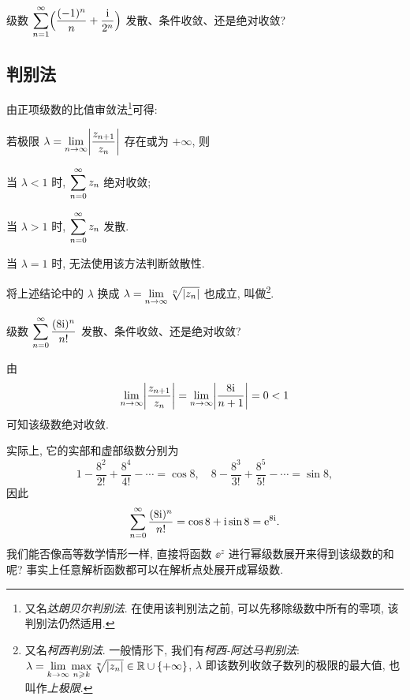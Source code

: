 \begin{exercise}
  级数 $\displaystyle\sum_{n=1}^{\infty} \Bigl(\frac{(-1)^n}n+\frac {\mathrm{i}}{2^n}\Bigr)$ 发散、条件收敛、还是绝对收敛?
\end{exercise}


\subsection{判别法}

由正项级数的比值审敛法\footnote{又名\emph{达朗贝尔判别法}. 在使用该判别法之前, 可以先移除级数中所有的零项, 该判别法仍然适用.}可得:
\begin{theorem}[比值审敛法]
  若极限 $\lambda=\lim\limits_{n\rightarrow\infty}\biggl\vert\dfrac{z_{n+1}}{z_n}\biggr\vert$ 存在或为 $+\infty$, 则
  \begin{enuma}
    \item 当 $\lambda<1$ 时, $\displaystyle\sum_{n=0}^{\infty} z_n$ 绝对收敛;
    \item 当 $\lambda>1$ 时, $\displaystyle\sum_{n=0}^{\infty} z_n$ 发散.
  \end{enuma}
\end{theorem}
当 $\lambda=1$ 时, 无法使用该方法判断敛散性.

将上述结论中的 $\lambda$ 换成 \alert{$\lambda=\lim\limits_{n\rightarrow\infty}\sqrt[n]{\lvert z_n\rvert}$} 也成立, 叫做\footnote{
  又名\emph{柯西判别法}.
  一般情形下, 我们有\emph{柯西-阿达马判别法}: 
  $\lambda=\lim\limits_{k\rightarrow\infty}\max\limits_{n\geqslant k}\sqrt[n]{\lvert z_n\rvert}\in{\mathbb{R}}\cup\{+\infty\}$, $\lambda$ 即该数列收敛子数列的极限的最大值, 也叫作\emph{上极限}.
}.

\begin{example}
  级数 $\displaystyle\sum_{n=0}^{\infty} \frac{(8\mathrm{i})^n}{n!}$ 发散、条件收敛、还是绝对收敛?
\end{example}

\begin{solution}
  由
  \[
     \lim_{n\rightarrow\infty}\biggl\vert\frac{z_{n+1}}{z_n}\biggr\vert
    =\lim_{n\rightarrow\infty}\biggl\vert\dfrac{8\mathrm{i}}{n+1}\biggr\vert
    =0<1
  \]
  可知该级数绝对收敛.
\end{solution}

实际上, 它的实部和虚部级数分别为
\[
  1-\frac{8^2}{2!}+\frac{8^4}{4!}-\cdots=\cos 8,\quad
  8-\frac{8^3}{3!}+\frac{8^5}{5!}-\cdots=\sin 8,
\]
因此
\[
   \displaystyle\sum_{n=0}^{\infty} \frac{(8\mathrm{i})^n}{n!}
  =\cos 8+\mathrm{i} \sin 8
  =\mathrm{e}^{8\mathrm{i}}.
\]
我们能否像高等数学情形一样, 直接将函数 $\ee^z$ 进行幂级数展开来得到该级数的和呢?
事实上任意解析函数都可以在解析点处展开成幂级数.



